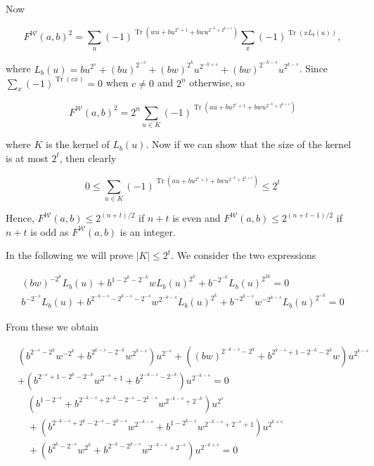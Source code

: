 \documentclass[10pt]{article}
\begin{document}
Now

$$
F^{\mathcal{W}}(a, b)^{2}=\sum_{u}(-1)^{\operatorname{Tr}\left(w u+b u^{2^{s}+1}+b w u^{2^{-k}+2^{k+s}}\right)} \sum_{x}(-1)^{\operatorname{Tr}\left(x L_{b}(u)\right)},
$$

where $L_{b}(u)=b u^{2^{s}}+(b u)^{2^{-s}}+(b w)^{2^{k}} u^{2^{-k+s}}+(b w)^{2^{-k-s}} u^{2^{k-s}}$. Since $\sum_{x}(-1)^{\operatorname{Tr}(c x)}=0$ when $c \neq 0$ and $2^{n}$ otherwise, so

$$
F^{\mathcal{W}}(a, b)^{2}=2^{n} \sum_{u \in K}(-1)^{\operatorname{Tr}\left(a u+b u^{2^{s}+1}+b w u^{2^{-k}+2^{k+s}}\right)}
$$

where $K$ is the kernel of $L_{b}(u)$. Now if we can show that the size of the kernel is at most $2^{t}$, then clearly

$$
0 \leqslant \sum_{u \in K}(-1)^{\operatorname{Tr}\left(a u+b u^{2^{s}+1}+b w u^{2^{-k}+2^{k+s}}\right)} \leqslant 2^{t}
$$

Hence, $F^{\mathcal{W}}(a, b) \leqslant 2^{(n+t) / 2}$ if $n+t$ is even and $F^{\mathcal{W}}(a, b) \leqslant 2^{(n+t-1) / 2}$ if $n+t$ is odd as $F^{\mathcal{W}}(a, b)$ is an integer.

In the following we will prove $|K| \leqslant 2^{t}$. We consider the two expressions

$$
\begin{gathered}
(b w)^{-2^{k}} L_{b}(u)+b^{1-2^{k}-2^{-k}} w L_{b}(u)^{2^{k}}+b^{-2^{-k}} L_{b}(u)^{2^{2 k}}=0 \\
b^{-2^{-s}} L_{b}(u)+b^{2^{-k-s}-2^{k-s}-2^{-s}} w^{2^{-k-s}} L_{b}(u)^{2^{k}}+b^{-2^{k-s}} w^{-2^{k-s}} L_{b}(u)^{2^{-k}}=0
\end{gathered}
$$

From these we obtain


\begin{align*}
& \left(b^{2^{-s}-2^{k}} w^{-2^{k}}+b^{2^{k-s}-2^{-k}} w^{2^{k-s}}\right) u^{2^{-s}}+\left((b w)^{2^{-k-s}-2^{k}}+b^{2^{k-s}+1-2^{-k}-2^{k}} w\right) u^{2^{k-s}} \\
& +\left(b^{2^{-s}+1-2^{k}-2^{-k}} w^{2^{-s}+1}+b^{2^{-k-s}-2^{-k}}\right) u^{2^{-k-s}}=0  \tag{8}\\
& \quad\left(b^{1-2^{-s}}+b^{2^{-k-s}+2^{-k}-2^{-s}-2^{k-s}} w^{2^{-k-s}+2^{-k}}\right) u^{2^{s}} \\
& \quad+\left(b^{2^{-k-s}+2^{k}-2^{-s}-2^{k-s}} w^{2^{-k-s}}+b^{1-2^{k-s}} w^{2^{-k-s}+2^{-s}+1}\right) u^{2^{k+s}} \\
& \quad+\left(b^{2^{k}-2^{-s}} w^{2^{k}}+b^{2^{-k}-2^{k-s}} w^{2^{-k-s}+2^{-s}}\right) u^{2^{-k+s}}=0 \tag{9}
\end{align*}
\end{document}
